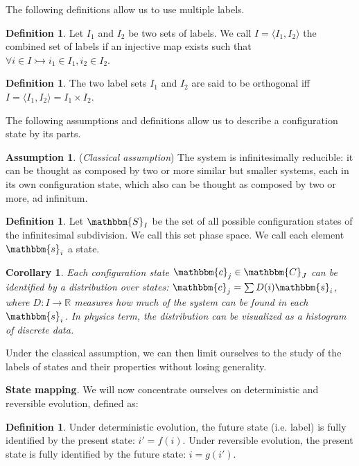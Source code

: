 \documentclass[twocolumn,floatfix,nofootinbib]{revtex4}   %
\theoremstyle{theorem}
\newtheorem{cor}[thm]{Corollary}
\theoremstyle{definition}
\newtheorem{defn}[thm]{Definition}
\newtheorem{assump}[thm]{Assumption}
\begin{document}
The following definitions allow us to use multiple labels.

\begin{defn}\label{combine label}
Let $I_1$ and $I_2$ be two sets of labels. We call $I = \langle I_1, I_2 \rangle$ the combined set of labels if an injective map exists such that $\forall i \in I \rightarrowtail i_1 \in I_1, i_2 \in I_2$.
\end{defn}

\begin{defn}\label{orth}
The two label sets $I_1$ and $I_2$ are said to be orthogonal iff $I = \langle I_1, I_2 \rangle = I_1 \times I_2$.
\end{defn}

The following assumptions and definitions allow us to describe a configuration state by its parts.

\begin{assump}\label{classical}
(\emph{Classical assumption}) The system is infinitesimally reducible: it can be thought as composed by two or more similar but smaller systems, each in its own configuration state, which also can be thought as composed by two or more, ad infinitum.
\end{assump}

\begin{defn}\label{statedef}
Let $\mathbbm{S}_I$ be the set of all possible configuration states of the infinitesimal subdivision. We call this set phase space. We call each element $\mathbbm{s}_i$ a state.
\end{defn}

\begin{cor}\label{statedistr}
Each configuration state $\mathbbm{c}_j \in \mathbbm{C}_J$ can be identified by a distribution over states: $\mathbbm{c}_j=\sum D(i) \mathbbm{s}_i$, where $D:I\rightarrow\mathbb{R}$ measures how much of the system can be found in each $\mathbbm{s}_i$. In physics term, the distribution can be visualized as a histogram of discrete data.
\end{cor}

Under the classical assumption, we can then limit ourselves to the study of the labels of states and their properties without losing generality.

\textbf{State mapping}. We will now concentrate ourselves on deterministic and reversible evolution, defined as:
\begin{defn}\label{determ}
Under deterministic evolution, the future state (i.e. label) is fully identified by the present state: $i'=f(i)$. Under reversible evolution, the present state is fully identified by the future state: $i=g(i')$.
\end{defn}
\end{document}

